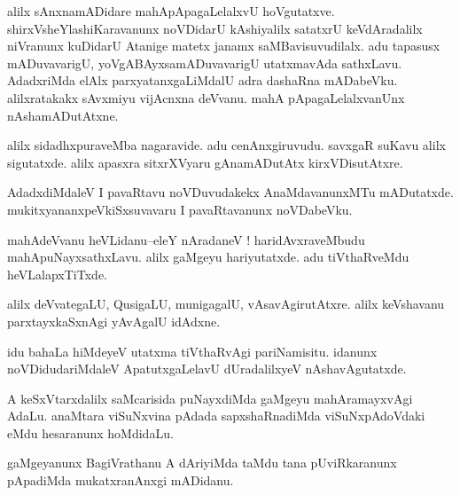 \documentclass{article}
\begin{document}
\begin{mn}%
alilx sAnxnamADidare mahApApagaLelalxvU hoVgutatxve. shirxVsheYlashiKaravanunx noVDidarU 
kAshiyalilx satatxrU keVdAradalilx niVranunx kuDidarU Atanige matetx janamx 
saMBavisuvudilalx. adu tapasusx mADuvavarigU, yoVgABAyxsamADuvavarigU utatxmavAda 
sathxLavu. AdadxriMda elAlx parxyatanxgaLiMdalU adra dashaRna mADabeVku. alilxratakakx 
sAvxmiyu vijAcnxna deVvanu. mahA pApagaLelalxvanUnx nAshamADutAtxne.
\end{mn}

\begin{mn}%
alilx sidadhxpuraveMba nagaravide. adu cenAnxgiruvudu. savxgaR suKavu alilx sigutatxde. 
alilx apasxra sitxrXVyaru gAnamADutAtx kirxVDisutAtxre.
\end{mn}

\begin{mn}%
AdadxdiMdaleV I pavaRtavu noVDuvudakekx AnaMdavanunxMTu mADutatxde. 
mukitxyananxpeVkiSxsuvavaru I pavaRtavanunx noVDabeVku.
\end{mn}


\begin{mn}%
mahAdeVvanu heVLidanu--eleY nAradaneV ! haridAvxraveMbudu mahApuNayxsathxLavu. alilx gaMgeyu 
hariyutatxde. adu tiVthaRveMdu heVLalapxTiTxde.
\end{mn}

\begin{mn}%
alilx deVvategaLU, QusigaLU, munigagalU, vAsavAgirutAtxre. alilx keVshavanu parxtayxkaSxnAgi 
yAvAgalU idAdxne.
\end{mn}

\begin{mn}%
idu bahaLa hiMdeyeV utatxma tiVthaRvAgi pariNamisitu. idanunx noVDidudariMdaleV 
ApatutxgaLelavU dUradalilxyeV nAshavAgutatxde.
\end{mn}

\begin{mn}%
A keSxVtarxdalilx saMcarisida puNayxdiMda gaMgeyu mahAramayxvAgi AdaLu. anaMtara viSuNxvina 
pAdada sapxshaRnadiMda viSuNxpAdoVdaki eMdu hesaranunx hoMdidaLu.
\end{mn}

\begin{mn}%
gaMgeyanunx BagiVrathanu A dAriyiMda taMdu tana pUviRkaranunx pApadiMda mukatxranAnxgi 
mADidanu.
\end{mn}
\end{document}
